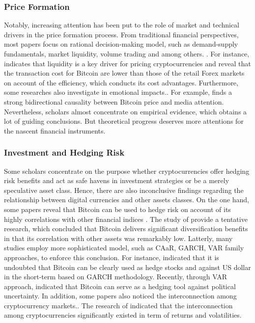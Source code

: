 \documentclass[review]{elsarticle}
\begin{document}
\subsubsection{Price Formation}
Notably, increasing attention has been put to the role of market and technical drivers in the price formation process. From traditional financial perspectives, most papers focus on rational decision-making model, such as demand-supply fundamentals, market liquidity, volume trading and among others. \cite{dyhrberg2018investible, brauneis2019cryptocurrency, kondor2014rich, Kim2017, balcilar2017can}. For instance, \cite{brauneis2019cryptocurrency} indicates that liquidity is a key driver for pricing cryptocurrencies and \cite{Kim2017} reveal that the transaction cost for Bitcoin are lower than those of the retail Forex markets on account of the efficiency, which conducts its cost advantages. Furthermore, some researches also investigate in emotional impacts.\cite{Kristoufek2018, polasik2015price, Feng2018, ali2014economics, kristoufek2013bitcoin, polasik2015price, Feng2018, zhang2018quantifying}. For example, \cite{Kristoufek2018} finds a strong bidirectional causality between Bitcoin price and media attention. Nevertheless, scholars almost concentrate on empirical evidence, which obtains a lot of guiding conclusions. But theoretical progress deserves more attentions for the nascent financial instruments.

\subsubsection{Investment and Hedging Risk}
Some scholars concentrate on the purpose whether cryptocurrencies offer hedging risk benefits and act as safe havens in investment strategies or be a merely speculative asset class. Hence, there are also inconclusive findings regarding the relationship between digital currencies and other assets classes. On the one hand, some papers reveal that Bitcoin can be used to hedge risk on account of its highly correlations with other financial indices \cite{Dyhrberg2016, demir2018does, briere2015virtual, bouri2019co}. The study of \cite{briere2015virtual} provide a tentative research, which concluded that Bitcoin delivers significant diversification benefits in that its correlation with other assets was remarkably low. Latterly, many studies employ more sophisticated model, such as CAaR, GARCH, VAR family approaches, to enforce this conclusion. For instance, \cite{Dyhrberg2016} indicated that it is undoubted that Bitcoin can be clearly used as hedge stocks and against US dollar in the short-term based on GARCH methodology. Recently, through VAR approach, \cite{demir2018does} indicated that Bitcoin can serve as a hedging tool against political uncertainty. In addition, some papers also noticed the interconnection among cryptocurrency markets.\cite{Corbet2018, Trabelsi2018, Yi2018, Gkillas2018, Koutmos2018}. The research of \cite{Yi2018} indicated that the interconnection among cryptocurrencies significantly existed in term of returns and volatilities.
\end{document}
